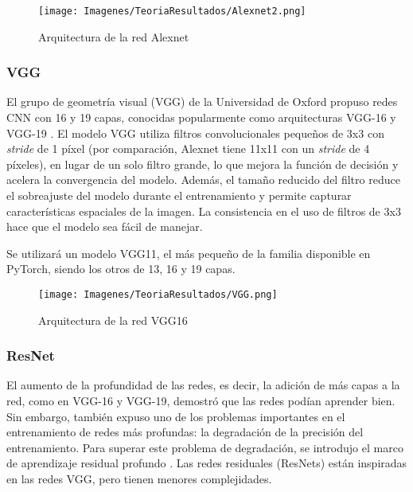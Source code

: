 \documentclass{report}
\begin{document}
\vspace{1.2cm}
\begin{figure}[H]
    \centering
    \texttt{[image: Imagenes/TeoriaResultados/Alexnet2.png]}
    \caption{Arquitectura de la red Alexnet \cite{AlexNetPaper}}
    \label{fig:Alexnet}
\end{figure}
\vspace{0.4cm}

\newpage
\subsubsection{VGG}

El grupo de geometría visual (VGG) de la Universidad de Oxford propuso redes CNN con 16 y 19 capas, conocidas popularmente como arquitecturas VGG-16 y VGG-19 \cite{VGGPaper}. El modelo VGG utiliza filtros convolucionales pequeños de 3x3 con \textit{stride} de 1 píxel (por comparación, Alexnet tiene 11x11 con un \textit{stride} de 4 píxeles), en lugar de un solo filtro grande, lo que mejora la función de decisión y acelera la convergencia del modelo. Además, el tamaño reducido del filtro reduce el sobreajuste del modelo durante el entrenamiento y permite capturar características espaciales de la imagen. La consistencia en el uso de filtros de 3x3 hace que el modelo sea fácil de manejar. 

Se utilizará un modelo VGG11, el más pequeño de la familia disponible en PyTorch, siendo los otros de 13, 16 y 19 capas.

\vspace{1.2cm}
\begin{figure}[H]
    \centering
    \texttt{[image: Imagenes/TeoriaResultados/VGG.png]}
    \caption{Arquitectura de la red VGG16 \cite{EzequielCNN}}
    \label{fig:VGG}
\end{figure}
\vspace{0.4cm}

\newpage
\subsubsection{ResNet}

El aumento de la profundidad de las redes, es decir, la adición de más capas a la red, como en VGG-16 y VGG-19, demostró que las redes podían aprender bien. Sin embargo, también expuso uno de los problemas importantes en el entrenamiento de redes más profundas: la degradación de la precisión del entrenamiento. Para superar este problema de degradación, se introdujo el marco de aprendizaje residual profundo \cite{ResNetPaper}. Las redes residuales (ResNets) están inspiradas en las redes VGG, pero tienen menores complejidades.
\end{document}

